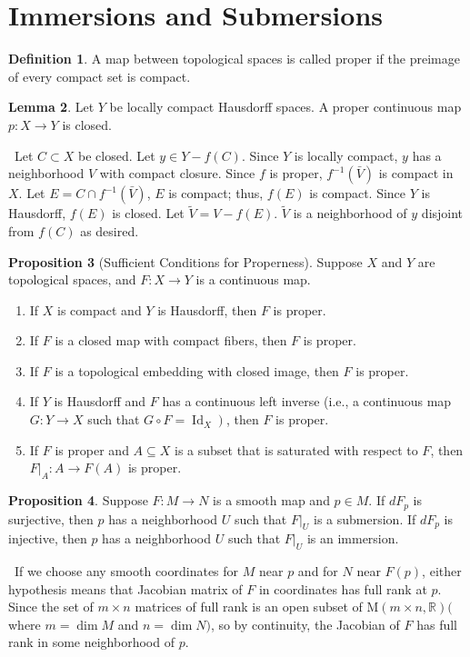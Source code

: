 \documentclass[12pt,a4paper]{book}
\newenvironment{prooff}{{\noindent\it\textcolor{cyan!40!black}{Proof}:}\,}{\par}
\newenvironment{enu}{\begin{enumerate}[(1)]}{\end{enumerate}}
\theoremstyle{definition}
\newtheorem{defn}{Definition}[section]
\newtheorem{lem}[defn]{Lemma}
\newtheorem{prop}[defn]{Proposition}
\begin{document}
\section{Immersions and Submersions}
\begin{defn}
    A map between topological spaces is called proper if the preimage of every compact set is compact.
\end{defn}
\begin{lem}
    Let $Y$ be locally compact Hausdorff spaces. A proper continuous map $p: X \rightarrow Y$ is closed.
    \label{lemma:proper continuous, closed}
\end{lem}
\begin{prooff}
    Let $C \subset X$ be closed. Let $y \in Y-f(C)$.
    Since $Y$ is locally compact, $y$ has a neighborhood $V$ with compact closure.
    Since $f$ is proper, $f^{-1}(\bar{V})$ is compact in $X$.
    Let $E=C \cap f^{-1}(\bar{V})$, $E$ is compact; thus, $f(E)$ is compact.
    Since $Y$ is Hausdorff, $f(E)$ is closed. Let $\tilde{V}=V-f(E)$. $\tilde{V}$ is a neighborhood of $y$ disjoint from $f(C)$ as desired.
\end{prooff}
\begin{prop}[Sufficient Conditions for Properness]
    Suppose $X$ and $Y$ are topological spaces, and $F: X \rightarrow Y$ is a continuous map.
    \begin{enu}
        \item If $X$ is compact and $Y$ is Hausdorff, then $F$ is proper.
        \item If $F$ is a closed map with compact fibers, then $F$ is proper.
        \item If $F$ is a topological embedding with closed image, then $F$ is proper.
        \item If $Y$ is Hausdorff and $F$ has a continuous left inverse (i.e., a continuous map $G: Y \rightarrow X$ such that $\left.G \circ F=\operatorname{Id}_X\right)$, then $F$ is proper.
        \item If $F$ is proper and $A \subseteq X$ is a subset that is saturated with respect to $F$, then $\left.F\right|_A: A \rightarrow F(A)$ is proper.
    \end{enu}
\end{prop}
\begin{prop}
    Suppose $F: M \rightarrow N$ is a smooth map and $p \in M$. If $d F_p$ is surjective, then $p$ has a neighborhood $U$ such that $\left.F\right|_U$ is a submersion. If $d F_p$ is injective, then $p$ has a neighborhood $U$ such that $\left.F\right|_U$ is an immersion.
\end{prop}
\begin{prooff}
    If we choose any smooth coordinates for $M$ near $p$ and for $N$ near $F(p)$, either hypothesis means that Jacobian matrix of $F$ in coordinates has full rank at $p$. Since the set of $m \times n$ matrices of full rank is an open subset of $\mathrm{M}(m \times n, \mathbb{R})($ where $m=\operatorname{dim} M$ and $n=\operatorname{dim} N)$,
    so by continuity, the Jacobian of $F$ has full rank in some neighborhood of $p$.
\end{prooff}
\end{document}
